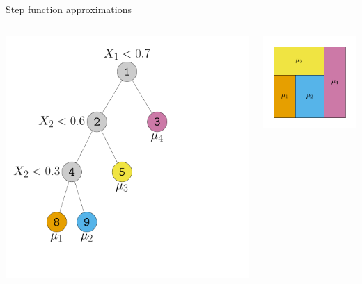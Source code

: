 \documentclass[aspectratio=199]{beamer}
\begin{document}
\begin{frame}{Step function approximations}
\begin{columns}
\begin{column}{0.25\textwidth}
\centering
\includegraphics[width = \textwidth]{figures/old_decision_rule}
\end{column}
\begin{column}{0.25\textwidth}
\centering
\includegraphics[width = \textwidth]{figures/old_partition}
\end{column}


\end{columns}
\end{frame}
\end{document}
